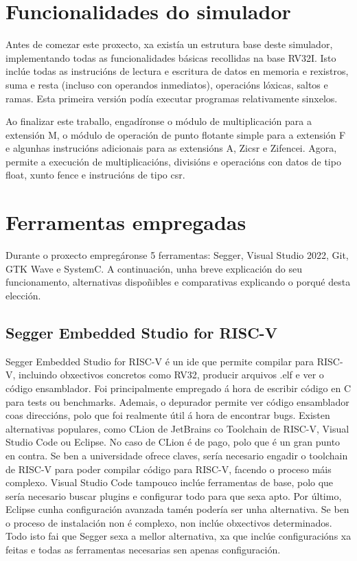 \section{Funcionalidades do simulador}\label{sec:func_sim}
Antes de comezar este proxecto, xa existía un estrutura base deste simulador, implementando todas as funcionalidades básicas recollidas na base RV32I. Isto inclúe todas as instrucións de lectura e escritura de datos en memoria e rexistros, suma e resta (incluso con operandos inmediatos), operacións lóxicas, saltos e ramas. Esta primeira versión podía executar programas relativamente sinxelos.

Ao finalizar este traballo, engadíronse o módulo de multiplicación para a extensión M, o módulo de operación de punto flotante simple para a extensión F e algunhas instrucións adicionais para as extensións A, Zicsr e Zifencei. Agora, permite a execución de multiplicacións, divisións e operacións con datos de tipo float, xunto fence e instrucións de tipo \acrshort{csr}.

\section{Ferramentas empregadas}\label{sec:ferramentas}
Durante o proxecto empregáronse 5 ferramentas: Segger, Visual Studio 2022, Git, GTK Wave e SystemC. A continuación, unha breve explicación do seu funcionamento, alternativas dispoñibles e comparativas explicando o porqué desta elección.

\subsection{Segger Embedded Studio for RISC-V}\label{sec:segger}
Segger Embedded Studio for RISC-V é un \acrfull{ide} que permite compilar para RISC-V, incluindo obxectivos concretos como RV32, producir arquivos .elf e ver o código ensamblador. Foi principalmente empregado á hora de escribir código en C para \gls{tests} ou \gls{benchmarks}. Ademais, o depurador permite ver código ensamblador coas direccións, polo que foi realmente útil á hora de encontrar bugs. Existen alternativas populares, como CLion de JetBrains co Toolchain de RISC-V, Visual Studio Code ou Eclipse. No caso de CLion é de pago, polo que é un gran punto en contra. Se ben a universidade ofrece claves, sería necesario engadir o toolchain de RISC-V para poder compilar código para RISC-V, facendo o proceso máis complexo. Visual Studio Code tampouco inclúe ferramentas de base, polo que sería necesario buscar plugins e configurar todo para que sexa apto. Por último, Eclipse cunha configuración avanzada tamén podería ser unha alternativa. Se ben o proceso de instalación non é complexo, non inclúe obxectivos determinados. Todo isto fai que Segger sexa a mellor alternativa, xa que inclúe configuracións xa feitas e todas as ferramentas necesarias sen apenas configuración.

